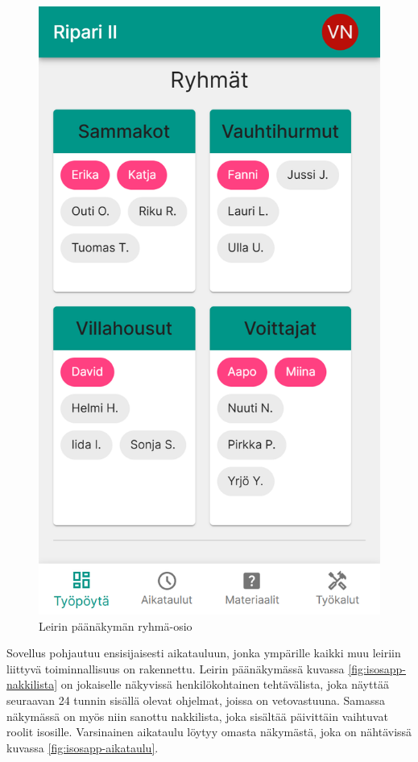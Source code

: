 \begin{figure}[h!]
\begin{minipage}[b]{.3\textwidth}
        \includegraphics[width=\textwidth]{figures/isosapp-ryhmat.png}
        \caption{Leirin päänäkymän ryhmä-osio}
        \label{fig:isosapp-ryhmat}
    \end{minipage}
\end{figure}

Sovellus pohjautuu ensisijaisesti aikatauluun, jonka ympärille kaikki muu
leiriin liittyvä toiminnallisuus on rakennettu. Leirin päänäkymässä kuvassa
\ref{fig:isosapp-nakkilista} on jokaiselle näkyvissä henkilökohtainen
tehtävälista, joka näyttää seuraavan 24 tunnin sisällä olevat ohjelmat, joissa
on vetovastuuna. Samassa näkymässä on myös niin sanottu nakkilista, joka
sisältää päivittäin vaihtuvat roolit isosille. Varsinainen aikataulu löytyy
omasta näkymästä, joka on nähtävissä kuvassa \ref{fig:isosapp-aikataulu}.

